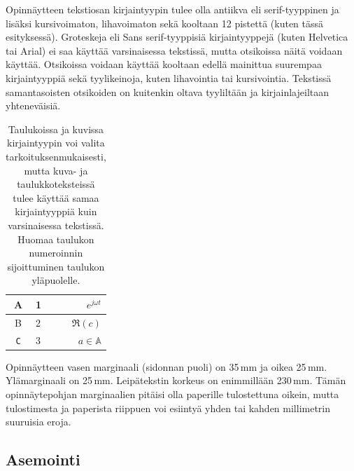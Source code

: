 Opinnäytteen tekstiosan kirjaintyypin tulee olla antiikva eli
serif\--tyyp\-pi\-nen ja lisäksi kursivoimaton, lihavoimaton sekä kooltaan 12
pistettä (kuten tässä esityksessä). Groteskeja eli \textsf{Sans serif}-tyyppisiä
kirjaintyyppejä (kuten Helvetica tai Arial) ei saa käyttää varsinaisessa
tekstissä, mutta otsikoissa näitä voidaan käyttää.  Otsikoissa voidaan käyttää
kooltaan edellä mainittua suurempaa kirjaintyyppiä sekä tyylikeinoja, kuten
lihavointia tai kursivointia. Tekstissä samantasoisten otsikoiden on kuitenkin
oltava tyyliltään ja kirjainlajeiltaan yhteneväisiä.

\begin{table}[htb]
\caption{Taulukoissa ja kuvissa kirjaintyypin voi valita
tarkoituksenmukaisesti, mutta kuva- ja taulukkoteksteissä tulee
käyttää samaa kirjaintyyppiä kuin varsinaisessa tekstissä. 
Huomaa taulukon numeroinnin sijoittuminen taulukon yläpuolelle. \label{taulukko1}}
\centering
\begin{tabular}{|c|l|r|}
\hline 
\textbf{A} & 1 & $e^{j \omega t}$ \\ \hline
\textsf{B} & 2 & ${\mathfrak R}(c)$ \\ \hline
\texttt{C} & 3 & $ a \in \mathbb{A}$ \\ 
\hline
\end{tabular}
\end{table}

Opinnäytteen vasen marginaali (sidonnan puoli) on
35\,mm %
ja oikea 25\,mm. Ylämarginaali on 25\,mm. Leipätekstin korkeus on
enimmillään 230\,mm. Tämän opinnäytepohjan marginaalien pitäisi olla
paperille tulostettuna oikein, mutta tulostimesta ja paperista
riippuen voi esiintyä yhden tai kahden millimetrin suuruisia eroja.
\subsection{Asemointi}

